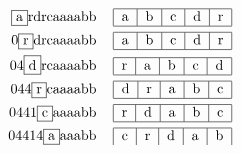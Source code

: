 \documentclass{article}
\begin{document}
\begin{align*}
    \begin{tabular}{cr}
        \framebox{a}rdrcaaaabb 
        & 
        \begin{tabular}{|c|c|c|c|c|}
            \hline
            a & b & c & d & r \\
            \hline
        \end{tabular}
    \end{tabular} \\
    \begin{tabular}{cr}
        0\framebox{r}drcaaaabb 
        & 
        \begin{tabular}{|c|c|c|c|c|}
            \hline
            a & b & c & d & r \\
            \hline
        \end{tabular}
    \end{tabular} \\
    \begin{tabular}{cr}
        04\framebox{d}rcaaaabb 
        & 
        \begin{tabular}{|c|c|c|c|c|}
            \hline
            r & a & b & c & d \\
            \hline
        \end{tabular}
    \end{tabular} \\
    \begin{tabular}{cr}
        044\framebox{r}caaaabb 
        & 
        \begin{tabular}{|c|c|c|c|c|}
            \hline
            d & r & a & b & c \\
            \hline
        \end{tabular}
    \end{tabular} \\
    \begin{tabular}{cr}
        0441\framebox{c}aaaabb 
        & 
        \begin{tabular}{|c|c|c|c|c|}
            \hline
            r & d & a & b & c \\
            \hline
        \end{tabular}
    \end{tabular} \\
    \begin{tabular}{cr}
        04414\framebox{a}aaabb 
        & 
        \begin{tabular}{|c|c|c|c|c|}
            \hline
            c & r & d & a & b \\

\end{tabular}
\end{tabular}
\end{align*}
\end{document}
